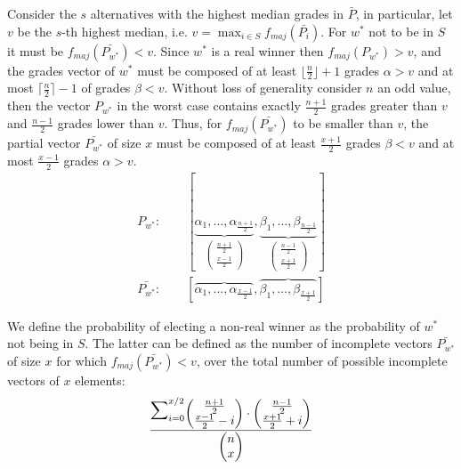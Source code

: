 \documentclass[version=3.21, pagesize, twoside=off, bibliography=totoc, DIV=calc, fontsize=12pt, a4paper]{scrartcl}
\begin{document}
Consider the $s$ alternatives with the highest median grades in $\bar{P}$, in particular, let $v$ be the $s$-th highest median, i.e. $v=\max_{i\in S}f_{maj}(\bar{P_i})$. 
For $w^*$ not to be in $S$ it must be $f_{maj}(\bar{P_{w^*}})<v$. 
Since $w^*$ is a real winner then $f_{maj}(P_{w^*})>v$, and the grades vector of $w^*$ must be composed of at least $\lfloor \frac{n}{2}\rfloor+1$ grades $\alpha>v$ and at most $\lceil \frac{n}{2}\rceil-1$ of grades $\beta<v$. 
Without loss of generality consider $n$ an odd value, then the vector $P_{w^*}$ in the worst case contains exactly $\frac{n+1}{2}$ grades greater than $v$ and $\frac{n-1}{2}$ grades lower than $v$. Thus, for $f_{maj}(\bar{P_{w^*}})$ to be smaller than $v$, the partial vector $\bar{P_{w^*}}$ of size $x$ must be composed of at least $\frac{x+1}{2}$ grades $\beta<v$ and at most $\frac{x-1}{2}$ grades $\alpha>v$. 
\begin{align}
	P_{w^*}: \qquad [ \underbrace{\alpha_1, \dots , \alpha_{\frac{n+1}{2}}}_{\begin{pmatrix}\frac{n+1}{2} \\ \frac{x-1}{2}\end{pmatrix}}, \underbrace{\beta_1, \dots , \beta_{\frac{n-1}{2}}}_{\begin{pmatrix}\frac{n-1}{2} \\ {\frac{x+1}{2}}\end{pmatrix}} ] \\
	\bar{P_{w^*}}:\qquad [ \overbrace{\alpha_1, \dots , \alpha_{\frac{x-1}{2}}}, \overbrace{\beta_1, \dots , \beta_{\frac{x+1}{2}}}]
\end{align} 

\newcommand{\largemath}[1]{{\mathlarger{\mathlarger{\mathlarger{\mathlarger{\mathlarger#1}}}}}}
We define the probability of electing a non-real winner as the probability of $w^*$ not being in $S$. The latter can be defined as the number of incomplete vectors $\bar{P_{w^*}}$ of size $x$ for which $f_{maj}(\bar{P_{w^*}})<v$, over the total number of possible incomplete vectors of $x$ elements:
\[ \frac{ \largemath{\sum}_{i=0}^{x/2}{ \begin{pmatrix}\frac{n+1}{2} \\ {\frac{x-1}{2}-i}\end{pmatrix} \cdot \begin{pmatrix}\frac{n-1}{2} \\ {\frac{x+1}{2}+i}\end{pmatrix} }}{\begin{pmatrix}n \\ x\end{pmatrix}} \]
\end{document}

